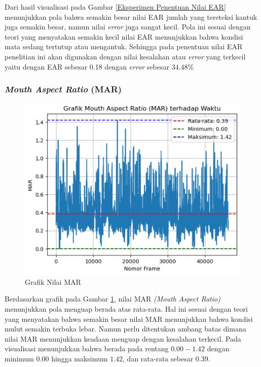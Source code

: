           Dari hasil visualisasi pada Gambar \ref{Eksperimen Penentuan Nilai EAR} menunjukkan pola bahwa semakin besar nilai EAR jumlah yang tereteksi kantuk juga semakin besar, namun nilai \textit{error }juga sangat kecil. Pola ini sesuai dengan teori yang menyatakan semakin kecil nilai EAR menunjukkan bahwa kondisi mata sedang tertutup atau mengantuk. Sehingga pada penentuan nilai EAR penelitian ini akan digunakan dengan nilai kesalahan atau \textit{error} yang terkecil yaitu dengan EAR sebesar 0.18 dengan \textit{error} sebesar $34.48\%$\\

    

\subsubsection{\textit{Mouth Aspect Ratio} (MAR)}
    
    
             \begin{figure}[H]
                 \centering
                 \includegraphics[width=0.8\linewidth]{figures/bab4/nilai mar.png}
                 \caption{Grafik Nilai MAR}
                 \label{Grafik Nilai MAR}
             \end{figure}



        
            Berdasarkan grafik pada Gambar \ref{Grafik Nilai MAR}, nilai MAR \textit{(Mouth Aspect Ratio)} menunjukkan pola menguap berada atas rata-rata. Hal ini sesuai dengan teori yang menyatakan bahwa semakin besar nilai MAR menunjukkan bahwa kondisi mulut semakin terbuka lebar. Namun perlu ditentukan ambang batas dimana nilai MAR menunjukkan keadaan menguap dengan kesalahan terkecil. Pada visualisasi menunjukkan bahwa berada pada rentang $0.00 - 1.42$ dengan minimum $0.00$ hingga maksimum $1.42$, dan rata-rata sebesar $0.39$. 
            
